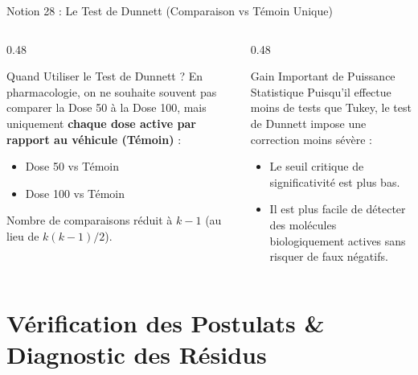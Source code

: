 \documentclass[aspectratio=169,10pt]{beamer}
\begin{document}
\begin{frame}{Notion 28 : Le Test de Dunnett (Comparaison vs Témoin Unique)}
  \begin{columns}[onlytextwidth, T]
    \begin{column}{0.48\linewidth}
      \begin{conceptbox}{Quand Utiliser le Test de Dunnett ?}
        En pharmacologie, on ne souhaite souvent pas comparer la Dose 50 à la Dose 100, mais uniquement \textbf{chaque dose active par rapport au véhicule (Témoin)} :
        \begin{itemize}
          \item Dose 50 vs Témoin
          \item Dose 100 vs Témoin
        \end{itemize}
        Nombre de comparaisons réduit à $k - 1$ (au lieu de $k(k-1)/2$).
      \end{conceptbox}
    \end{column}
    \begin{column}{0.48\linewidth}
      \begin{takeawaybox}{Gain Important de Puissance Statistique}
        Puisqu'il effectue moins de tests que Tukey, le test de Dunnett impose une correction moins sévère :
        \begin{itemize}
          \item Le seuil critique de significativité est plus bas.
          \item Il est plus facile de détecter des molécules biologiquement actives sans risquer de faux négatifs.
        \end{itemize}
      \end{takeawaybox}
    \end{column}
  \end{columns}
\end{frame}

\section{Vérification des Postulats \& Diagnostic des Résidus}
\end{document}
